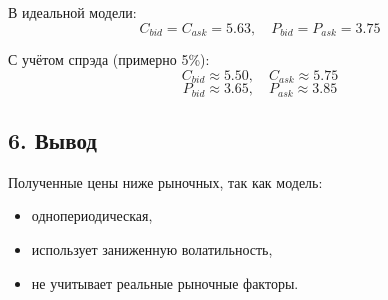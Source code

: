 В идеальной модели:
\[
C_{bid} = C_{ask} = 5.63, \quad
P_{bid} = P_{ask} = 3.75
\]

С учётом спрэда (примерно 5\%):
\[
C_{bid} \approx 5.50, \quad C_{ask} \approx 5.75
\]
\[
P_{bid} \approx 3.65, \quad P_{ask} \approx 3.85
\]

\subsection*{6. Вывод}

Полученные цены ниже рыночных, так как модель:
\begin{itemize}
\item однопериодическая,
\item использует заниженную волатильность,
\item не учитывает реальные рыночные факторы.
\end{itemize}
